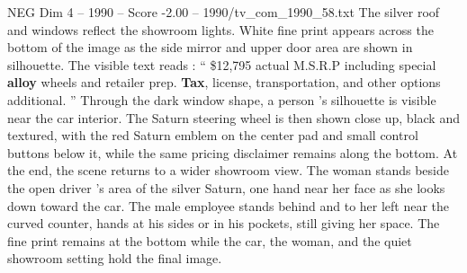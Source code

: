 \begin{textsample}{NEG Dim 4 – 1990 – Score -2.00 – 1990/tv\_com\_1990\_58.txt}
The silver roof and windows reflect the showroom lights.
White fine print appears across the bottom of the image as the side mirror and upper door area are shown in silhouette.
The visible text reads : “ \$12,795 actual M.S.R.P including special \textbf{alloy} wheels and retailer prep. \textbf{Tax}, license, transportation, and other options additional. ” Through the dark window shape, a person ’s silhouette is visible near the car interior.
The Saturn steering wheel is then shown close up, black and textured, with the red Saturn emblem on the center pad and small control buttons below it, while the same pricing disclaimer remains along the bottom.
At the end, the scene returns to a wider showroom view.
The woman stands beside the open driver ’s area of the silver Saturn, one hand near her face as she looks down toward the car.
The male employee stands behind and to her left near the curved counter, hands at his sides or in his pockets, still giving her space.
The fine print remains at the bottom while the car, the woman, and the quiet showroom setting hold the final image.

\end{textsample}
